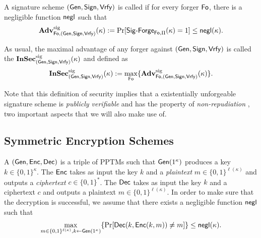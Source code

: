 
A signature scheme $(\Gen,\Sign,\Vrfy)$ is called  if for every forger $\Forg$, there is a negligible
function $\negl$ such that
\begin{align*}
  \Adv^{\sig}_{\Forg,(\Gen,\Sign,\Vrfy)}(\kappa) :=
  \Pr[\Sig-Forge_{\Forg,\Pi}(\kappa)=1]\leq \negl(\kappa).
\end{align*}

As usual, the maximal advantage of any forger against
$(\Gen,\Sign,\Vrfy)$ is called the 
$\InSec_{(\Gen,\Sign,\Vrfy)}^{\sig}(\kappa)$ and defined as
\begin{align*}
  \InSec_{(\Gen,\Sign,\Vrfy)}^{\sig}(\kappa) := \max_{\Forg}\{\Adv^{\sig}_{\Forg,(\Gen,\Sign,\Vrfy)}(\kappa)\}.
\end{align*}


Note that this definition of security implies that a existentially
unforgeable signature scheme is \emph{publicly verifiable} and has the
property of \emph{non-repudiation} \cite{lindell2007introduction}, two
important aspects that we will also make use of.

\subsection*{Symmetric Encryption Schemes}
A  $(\Gen, \Enc,\Dec)$ is a triple of
\acp{PPTM} such that $\Gen(1^{\kappa})$ produces a key
$k\in \{0,1\}^{\kappa}$. The  $\Enc$ takes as input the key $k$ and a \emph{plaintext}
$m\in \{0,1\}^{\ell(\kappa)}$ and outputs a \emph{ciphertext}
$c\in \{0,1\}^{*}$. The  $\Dec$ takes as
input the key $k$ and a ciphertext $c$ and outputs a plaintext
$m\in \{0,1\}^{\ell(\kappa)}$. In order to make sure that the decryption
is successful, we assume that there exists a negligible function $\negl$
such that 
\begin{align*}
\max_{m\in \{0,1\}^{\ell(\kappa)}, k\gets \Gen(1^{\kappa})}\{\Pr[\Dec(k,\Enc(k,m))\neq m]\}\leq\negl(\kappa).  
\end{align*}



